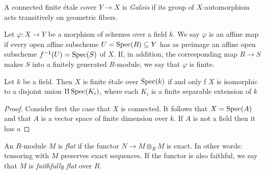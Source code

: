 \begin{definition}
	A connected finite \'etale cover $Y \to X$ is \textit{Galois} if its group of $X$-automorphism acts transitively on geometric fibers.
\end{definition}


\begin{definition}
	Let $\varphi: X \to Y$ be a morphism of schemes over a field $k$. We say $\varphi$ is an affine map if every open affine subscheme $U = \operatorname{Spec}(R) \subseteq Y$ has as preimage an affine open subscheme $f^{-1}(U) = \operatorname{Spec}(S)$ of $X$. If, in addition, the corresponding map $R \to S$ makes $S$ into a finitely generated $R$-module, we say that $\varphi$ is finite.
\end{definition}

\begin{proposition}
	Let $k$ be a field. Then $X$ is finite \'etale over $\operatorname{Spec}(k)$ if and only f $X$ is isomorphic to a disjoint union $\amalg \operatorname{Spec}(K_i)$, where each $K_i$ is a finite separable extension of $k$
\end{proposition}
\begin{proof}
	Consider first the case that $X$ is connected. It follows that $X = \operatorname{Spec}(A)$ and that $A$ is a vector space of finite dimension over $k$. If $A$ is not a field then it has a
\end{proof}



\begin{definition}
	An $R$-module $M$ is \textit{flat} if the functor $N \to M \otimes_R M$ is exact. In other words: tensoring with $M$ preserves exact sequences. If the functor is also faithful, we say that $M$ is \textit{faithfully flat} over $R$.
\end{definition}

%
%
